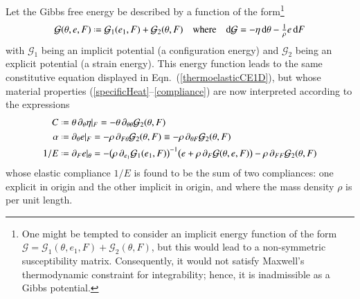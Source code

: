 Let the Gibbs free energy be described by a function of the form\footnote{
    One might be tempted to consider an implicit energy function of the form $\mathcal{G} = \mathcal{G}_1 (\theta ,  e_1 , F ) + \mathcal{G}_2 (\theta , F)$, but this would lead to a non-symmetric susceptibility matrix.  Consequently, it would not satisfy Maxwell's thermo\-dynamic constraint for integrability; hence, it is inadmissible as a Gibbs potential.
}
\begin{equation}
\mathcal{G} (\theta , e , F) \defeq \mathcal{G}_1 ( e_1 , F ) + \mathcal{G}_2 ( \theta , F )
\quad \text{where} \quad
\mathrm{d} \mathcal{G} = -\eta \, \mathrm{d} \theta - 
\tfrac{1}{\rho} e \, \mathrm{d} F
\label{GibbsFreeEnergy}
\end{equation}
with $\mathcal{G}_1$ being an implicit potential (a configuration energy) and $\mathcal{G}_2$ being an explicit potential (a strain energy).  This energy function leads to the same constitutive equation displayed in Eqn.~(\ref{thermoelasticCE1D}), but whose material properties (\ref{specificHeat}--\ref{compliance}) are now interpreted according to the expressions
\begin{subequations}
    \label{physicalFields1Dfiber}
    \begin{align}
    C & \defeq \theta \, \partial_{\theta} \eta |_F = 
    -\theta \, \partial_{\theta\theta} \mathcal{G}_2(\theta , F)
    \label{specificHeat1D} \\
    \alpha & \defeq \partial_{\theta} e |_F = 
    -\rho \, \partial_{F\theta} \mathcal{G}_2(\theta , F) \equiv
    -\rho \, \partial_{\theta F} \mathcal{G}_2(\theta , F)
    \label{thermalExpansion1D} \\
    1/E & \defeq \partial_F e |_{\theta} = -
    \bigl( \rho \, \partial_{e_1} \mathcal{G}_1 ( e_1, F ) \bigr)^{-1} 
    \bigl( e + \rho \, \partial_F \mathcal{G} (\theta , e , F) \bigr) -
    \rho \, \partial_{FF} \mathcal{G}_2(\theta , F)
    \label{compliance1D}
    \end{align}
\end{subequations}
whose elastic compliance $1/E$ is found to be the sum of two compliances: one explicit in origin and the other implicit in origin, and where the mass density $\rho$ is per unit length. 

